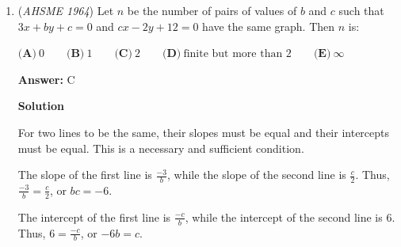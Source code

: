 \begin{enumerate}
 $\textbf{(A)}\ \text{(1) only}\qquad \textbf{(B)}\ \text{(2) only}\qquad \textbf{(C)}\ \text{(3) only}\qquad \textbf{(D)}\ \text{(1) or (2) only}\qquad \textbf{(E)}\ \text{all three}$

 \textbf{Answer: }D



\textbf{Solution}

Using vector addition can help solve this problem quickly.  Note that algebraically, adding $\overrightarrow{OP}$ to $\overrightarrow{OQ}$ will give $\overrightarrow{OR}$.  One method of vector addition is literally known as the "parallelogram rule" - if you are given $\overrightarrow{OP}$ and $\overrightarrow{OQ}$, to find $\overrightarrow{OR}$, you can literally draw a parallelogram, making a line though $P$ parallel to $OQ$, and a line through $Q$ parallel to $OP$.  The intersection of those lines will give the fourth point $R$, and that fourth point will form a parallelogram with $O, P, Q$.

 Thus, $1$ is a possibility.  Case $2$ is also a possibility, if $O, P, Q$ are collinear, then $R$ is also on that line.  

 Since $OP \parallel QR$ and $PQ \parallel RO$, which can be seen from either the prior reasoning or by examining slopes, the figure can never be a trapezoid, which requires exactly one of parallel sides.

 Thus, the answer is $\boxed{\textbf{(D)}}$



	\item (\textit{AHSME 1964}) Let $n$ be the number of pairs of values of $b$ and $c$ such that $3x+by+c=0$ and $cx-2y+12=0$ have the same graph. Then $n$ is:


 $\textbf{(A)}\ 0\qquad \textbf{(B)}\ 1\qquad \textbf{(C)}\ 2\qquad \textbf{(D)}\ \text{finite but more than 2}\qquad \textbf{(E)}\ \infty$

 \textbf{Answer: }C



\textbf{Solution}

For two lines to be the same, their slopes must be equal and their intercepts must be equal.  This is a necessary and sufficient condition.

 The slope of the first line is $\frac{-3}{b}$, while the slope of the second line is $\frac{c}{2}$.  Thus, $\frac{-3}{b} = \frac{c}{2}$, or $bc = -6$.

 The intercept of the first line is $\frac{-c}{b}$, while the intercept of the second line is $6$.  Thus, $6 = \frac{-c}{b}$, or $-6b = c$.


\end{enumerate}

